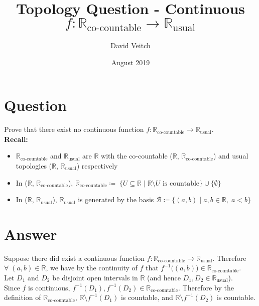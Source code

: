 \documentclass{article}
\title{Topology Question - Continuous $f:\mathbb{R}_\text{co-countable} \longrightarrow \mathbb{R}_\text{usual}$ }
\author{David Veitch}
\date{August 2019}
\begin{document}
\maketitle

\section{Question}

Prove that there exist no continuous function $f:\mathbb{R}_\text{co-countable} \longrightarrow \mathbb{R}_\text{usual}$.\\

\textbf{Recall:}
\begin{itemize}
    \item $\mathbb{R}_\text{co-countable}$ and $\mathbb{R}_\text{usual}$ are $\mathbb{R}$ with the co-countable ($\mathbb{R}$, $\mathbb{R}_\text{co-countable}$) and usual topologies ($\mathbb{R}$, $\mathbb{R}_\text{usual}$) respectively  
    \item In ($\mathbb{R}$, $\mathbb{R}_\text{co-countable}$), $\mathbb{R}_\text{co-countable} \coloneqq \; \{U \subseteq \mathbb{R} \; | \; \mathbb{R} \setminus U \text{ is countable} \} \cup \{\emptyset\}$
    \item In ($\mathbb{R}$, $\mathbb{R}_\text{usual}$), $\mathbb{R}_\text{usual}$ is generated by the basis $\mathcal{B} \coloneqq \{(a,b) \; | \; a,b \in \mathbb{R}, \; a < b \}$
\end{itemize}

\section{Answer}

Suppose there did exist a continuous function $f:\mathbb{R}_\text{co-countable} \longrightarrow \mathbb{R}_\text{usual}$. Therefore $\forall \; (a,b) \in \mathbb{R}$, we have by the continuity of $f$ that $f^{-1}\big( (a,b) \big) \in \mathbb{R}_\text{co-countable}$.\\

Let $D_{1}$ and $D_{2}$ be disjoint open intervals in $\mathbb{R}$ (and hence $D_{1},  D_{2} \in \mathbb{R}_\text{usual}$).\\

Since $f$ is continuous, $f^{-1}(D_1), f^{-1}(D_2) \in \mathbb{R}_\text{co-countable}$. Therefore by the definition of $\mathbb{R}_\text{co-countable}$, $\mathbb{R} \setminus f^{-1}(D_1)$ is countable, and  $\mathbb{R} \setminus f^{-1}(D_2)$ is countable.\\
\end{document}
